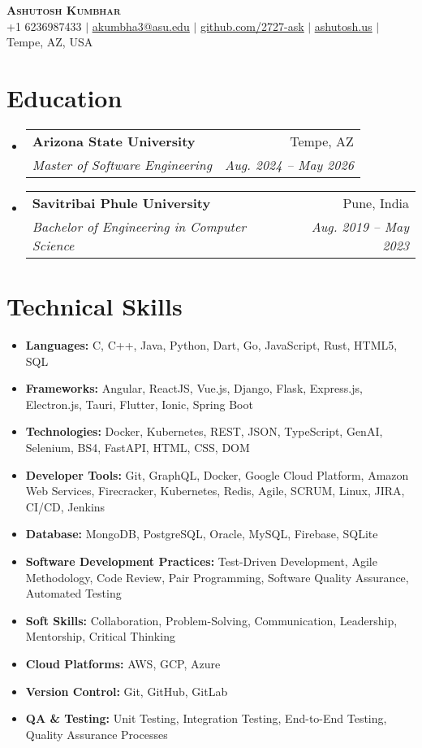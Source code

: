 \documentclass[letterpaper,11pt]{article}
\makeatletter
\newcommand{\resumeItem}[1]{
  \item\small{
    {#1 \vspace{-2pt}}
  }
}
\newcommand{\resumeSubheading}[4]{
  \vspace{-2pt}\item
    \begin{tabular*}{0.97\textwidth}[t]{l@{\extracolsep{\fill}}r}
      \textbf{#1} & #2 \\
      \textit{\small#3} & \textit{\small #4} \\
    \end{tabular*}\vspace{-7pt}
}
\newcommand{\resumeSubItem}[1]{\resumeItem{#1}\vspace{-4pt}}
\newcommand{\resumeSubHeadingListStart}{\begin{itemize}[leftmargin=0.15in, label={}]}
\newcommand{\resumeSubHeadingListEnd}{\end{itemize}}
\makeatother
\begin{document}
\begin{center}
    \textbf{\Huge \scshape Ashutosh Kumbhar} \\ \vspace{1pt}
    \small +1 6236987433 $|$ \href{mailto:akumbha3@asu.edu}{\underline{akumbha3@asu.edu}} $|$ 
    \href{https://github.com/2727-ask}{\underline{github.com/2727-ask}} $|$
    \href{https://ashutosh.us}{\underline{ashutosh.us}} $|$
    \small Tempe, AZ, USA
\end{center}


\section{Education}
  \resumeSubHeadingListStart
    \resumeSubheading
      {Arizona State University}{Tempe, AZ}
      {Master of Software Engineering}{Aug. 2024 -- May 2026}
    \resumeSubheading
      {Savitribai Phule University}{Pune, India}
      {Bachelor of Engineering in Computer Science}{Aug. 2019 -- May 2023}
  \resumeSubHeadingListEnd
  

\section{Technical Skills}
\resumeSubHeadingListStart
  \resumeSubItem{\textbf{Languages:} C, C++, Java, Python, Dart, Go, JavaScript, Rust, HTML5, SQL}
  \resumeSubItem{\textbf{Frameworks:} Angular, ReactJS, Vue.js, Django, Flask, Express.js, Electron.js, Tauri, Flutter, Ionic, Spring Boot}
  \resumeSubItem{\textbf{Technologies:} Docker, Kubernetes, REST, JSON, TypeScript, GenAI, Selenium, BS4, FastAPI, HTML, CSS, DOM}
  \resumeSubItem{\textbf{Developer Tools:} Git, GraphQL, Docker, Google Cloud Platform, Amazon Web Services, Firecracker, Kubernetes, Redis, Agile, SCRUM, Linux, JIRA, CI/CD, Jenkins}
  \resumeSubItem{\textbf{Database:} MongoDB, PostgreSQL, Oracle, MySQL, Firebase, SQLite}
  \resumeSubItem{\textbf{Software Development Practices:} Test-Driven Development, Agile Methodology, Code Review, Pair Programming, Software Quality Assurance, Automated Testing}
  \resumeSubItem{\textbf{Soft Skills:} Collaboration, Problem-Solving, Communication, Leadership, Mentorship, Critical Thinking}
  \resumeSubItem{\textbf{Cloud Platforms:} AWS, GCP, Azure}
  \resumeSubItem{\textbf{Version Control:} Git, GitHub, GitLab}
  \resumeSubItem{\textbf{QA & Testing:} Unit Testing, Integration Testing, End-to-End Testing, Quality Assurance Processes}
\resumeSubHeadingListEnd
\end{document}
